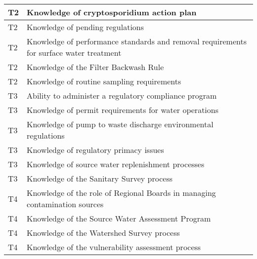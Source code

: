 \begin{table}[H]
\begin{tabular}{| m{1cm} |m{15cm} |}
T2 & Knowledge of   cryptosporidium action plan                                                                                \\ \hline
T2 & Knowledge of pending   regulations                                                                                        \\ \hline
T2 & Knowledge of   performance standards and removal requirements for surface water treatment                                 \\ \hline
T2 & Knowledge of the   Filter Backwash Rule                                                                                   \\ \hline
T2 & Knowledge of routine   sampling requirements                                                                              \\ \hline
T3 & Ability to administer   a regulatory compliance program                                                                   \\ \hline
T3 & Knowledge of permit   requirements for water operations                                                                   \\ \hline
T3 & Knowledge of pump to   waste discharge environmental regulations                                                          \\ \hline
T3 & Knowledge of   regulatory primacy issues                                                                                  \\ \hline
T3 & Knowledge of source   water replenishment processes                                                                       \\ \hline
T3 & Knowledge of the   Sanitary Survey process                                                                                \\ \hline
T4 & Knowledge of the role   of Regional Boards in managing contamination sources                                              \\ \hline
T4 & Knowledge of the   Source Water Assessment Program                                                                        \\ \hline
T4 & Knowledge of the   Watershed Survey process                                                                               \\ \hline
T4 & Knowledge of the   vulnerability assessment process                                                                       \\ \hline
\end{tabular}
\end{table}


